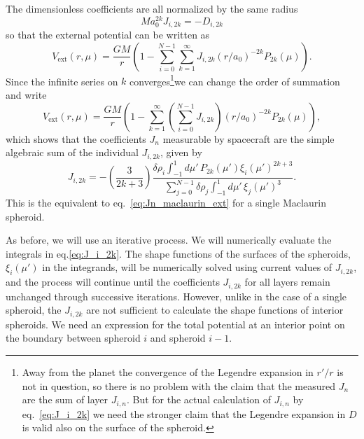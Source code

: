 \documentclass[amsmath,amsfonts,rmp,letterpaper]{revtex4}
\newcommand{\sub}[1]{_{\text{#1}}} %
\renewcommand{\inf}{\infty}
\newcommand{\ptk}{P_{2k}}
\newcommand{\sumoni}{\sum_{i=0}^{N-1}}
\newcommand{\dro}{\delta\rho}
\newcommand{\intonmu}{\int_{-1}^{1}}
\begin{document}
The dimensionless coefficients are all normalized by the same radius
\begin{equation}
Ma_0^{2k}J_{i,2k} = -D_{i,2k}
\end{equation}
so that the external potential can be written as
\begin{equation}
V\sub{ext}(r,\mu) = \frac{GM}{r}\left(1 -
\sumoni\sum_{k=1}^{\inf}J_{i,2k}(r/a_0)^{-2k}\ptk(\mu)\right).
\end{equation}
Since the infinite series on $k$ converges\WarningsOff\footnote{Away from the
planet the convergence of the Legendre expansion in $r'/r$ is not in question, so
there is no problem with the claim that the measured $J_n$ are the sum of layer
$J_{i,n}$. But for the actual calculation of $J_{i,n}$ by eq.~\eqref{eq:J_i_2k}
we need the stronger claim that the Legendre expansion in $D$ is valid also on the
surface of the spheroid.}\WarningsOn we can change the order of summation and
write
\begin{equation}
V\sub{ext}(r,\mu) = \frac{GM}{r}\left(1 -
\sum_{k=1}^{\inf}\left(\sumoni{}J_{i,2k}\right)(r/a_0)^{-2k}\ptk(\mu)\right),
\end{equation}
which shows that the coefficients $J_n$ measurable by spacecraft are the simple
algebraic sum of the individual $J_{i,2k}$, given by
\begin{equation}\label{eq:J_i_2k}
J_{i,2k} = -\left(\frac{3}{2k + 3}\right)
\frac{\dro_i\intonmu{d}\mu'\,\ptk(\mu')\xi_i(\mu')^{2k + 3}}
{\sum_{j=0}^{N-1}\dro_j\intonmu{d}\mu'\,\xi_j(\mu')^3}.
\end{equation}
This is the equivalent to eq.~\eqref{eq:Jn_maclaurin_ext} for a single Maclaurin
spheroid.

As before, we will use an iterative process. We will numerically evaluate the
integrals in eq.\eqref{eq:J_i_2k}. The shape functions of the surfaces of the
spheroids, $\xi_i(\mu')$ in the integrands, will be numerically solved using
current values of $J_{i,2k}$, and the process will continue until the coefficients
$J_{i,2k}$ for all layers remain unchanged through successive iterations. However,
unlike in the case of a single spheroid, the $J_{i,2k}$ are not sufficient to
calculate the shape functions of interior spheroids. We need an expression for the
total potential at an interior point on the boundary between spheroid $i$ and
spheroid $i-1$.
\end{document}
